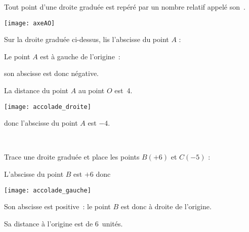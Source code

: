 \begin{methode*1}

\begin{aconnaitre}
Tout point d'une droite graduée est repéré par un nombre relatif appelé son .
\end{aconnaitre}

\begin{center} \texttt{[image: axeAO]} \end{center}

\begin{exemple*1}
Sur la droite graduée ci-dessus, lis l'abscisse du point $A$ : \\[1em]
\begin{minipage}[c]{0.4\linewidth}
Le point $A$ est à gauche de l'origine :

son abscisse est donc négative.

La distance du point $A$ au point $O$ est 4.
 \end{minipage} \hfill%
 \begin{minipage}[c]{0.1\linewidth}
 \begin{center}\texttt{[image: accolade\_droite]}\end{center}
  \end{minipage} \hfill%
  \begin{minipage}[c]{0.4\linewidth}
  donc l'abscisse du point $A$ est $- 4$.
   \end{minipage} \\
\end{exemple*1}


\begin{exemple*1}
Trace une droite graduée et place les points $B(+ 6)$ et $C(- 5)$ : \\[1em]
\begin{minipage}[c]{0.4\linewidth}
L'abscisse du point $B$ est $+ 6$ donc
 \end{minipage} \hfill%
 \begin{minipage}[c]{0.1\linewidth}
 \begin{center}\texttt{[image: accolade\_gauche]}\end{center}
  \end{minipage} \hfill%
  \begin{minipage}[c]{0.4\linewidth}
  Son abscisse est positive : le point $B$ est donc à droite de l'origine.
  
  Sa distance à l'origine est de 6 unités.
  \end{minipage} \\[0.5em]


\end{exemple*1}
\end{methode*1}
